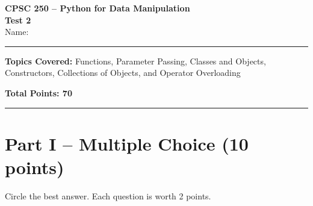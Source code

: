 \documentclass[11pt]{article}
\begin{document}
\begin{center}
{\Large \textbf{CPSC 250 -- Python for Data Manipulation}}\\
\vspace{0.2cm}
{\Large \textbf{Test 2}}\\
\vspace{0.5cm}
Name:\rule{3in}{0.4pt}
\end{center}

\vspace{0.25cm}

\textbf{Topics Covered:}
Functions, Parameter Passing, Classes and Objects, Constructors,
Collections of Objects, and Operator Overloading

\vspace{0.25cm}

\textbf{Total Points: 70}

\hrule

\vspace{0.3cm}

\section*{Part I -- Multiple Choice (10 points)}

Circle the best answer. Each question is worth 2 points.
\end{document}
